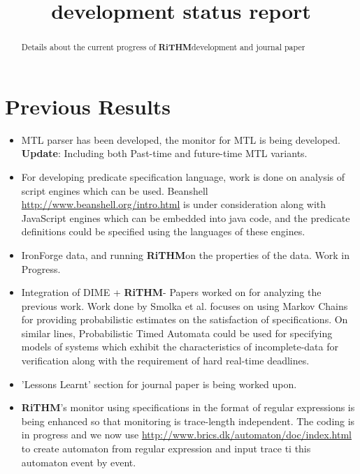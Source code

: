 \documentclass[]{article}
\title{\rithm development status report}
\author{}
\newcommand{\rithm}{\textbf{RiTHM}\space}
\begin{document}
\maketitle

\begin{abstract}
Details about the current progress of \rithm development and journal paper
\end{abstract}
\section{Previous Results}
\begin{itemize}
	
	
	\item MTL parser has been developed, the monitor for MTL is being developed. \textbf{Update}: Including both Past-time and future-time MTL variants. 
	\item For developing predicate specification language, work is done on analysis of script engines which can be used. Beanshell \url{http://www.beanshell.org/intro.html} is under consideration along with JavaScript engines which can be embedded into java code, and the predicate definitions could be specified using the languages of these engines.
	
	\item IronForge data, and running \rithm on the properties of the data. Work in Progress.
	
	\item Integration of DIME + \rithm - Papers worked on for analyzing the previous work. Work done by Smolka et al. focuses on using Markov Chains for providing probabilistic estimates on the satisfaction of specifications. On similar lines, Probabilistic Timed Automata could be used for specifying 
	models of systems which exhibit the characteristics of incomplete-data for verification along with the requirement of hard real-time deadlines.
	\item 'Lessons Learnt' section for journal paper is being worked upon.
	\item \rithm's monitor using specifications in the format of regular expressions is being enhanced so that monitoring is trace-length independent. The coding is in progress and we now use \url{http://www.brics.dk/automaton/doc/index.html} to create automaton from regular expression and input trace ti this automaton event by event. 
	
	
	
\end{itemize}
    
\end{document}
